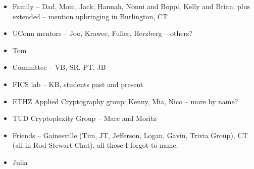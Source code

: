 


\begin{itemize}
    \item Family -- Dad, Mom, Jack, Hannah, Nonni and Boppi, Kelly and Brian; plus extended -- mention upbringing in Burlington, CT
    \item UConn mentors -- Joo, Krawec, Fuller, Herzberg -- others?
    \item Tom 
    \item Committee -- VB, SR, PT, JB
    \item FICS lab -- KB, students past and present
    \item ETHZ Applied Cryptography group: Kenny, Mia, Nico -- more by name?
    \item TUD Cryptoplexity Group  -- Marc and Moritz
    \item Friends -- Gainesville (Tim, JT, Jefferson, Logan, Gavin, Trivia Group), CT (all in Rod Stewart Chat), all those I forgot to name. 
    \item Julia
\end{itemize}